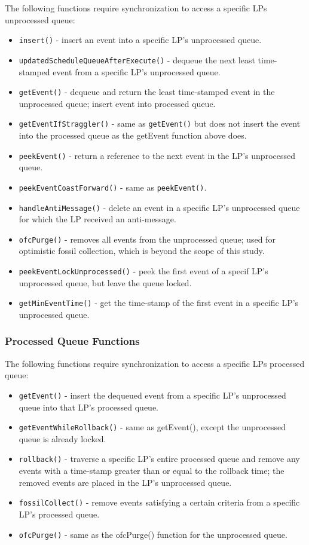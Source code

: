 \documentclass[a4paper]{article}
\let\origitem\item
\renewcommand{\item}{\normalfont\origitem}
\begin{document}
The following functions require synchronization to access a specific LPs
unprocessed queue:\par
\begin{itemize}
\item\texttt{insert()} - insert an event into a specific LP's unprocessed
queue.
\item\texttt{updatedScheduleQueueAfterExecute()} - dequeue the next least
time-stamped event from a specific LP's unprocessed queue.
\item\texttt{getEvent()} - dequeue and return the least time-stamped event in the
unprocessed queue; insert event into processed queue.
\item\texttt{getEventIfStraggler()} - same as \texttt{getEvent()} but does not insert
the event into the processed queue as the getEvent function above does.\
\item\texttt{peekEvent()} - return a reference to the next event in the LP's
unprocessed queue.
\item\texttt{peekEventCoastForward()} - same as \texttt{peekEvent()}.
\item\texttt{handleAntiMessage()} - delete an event in a specific LP's unprocessed queue
for which the LP received an anti-message.
\item\texttt{ofcPurge()} - removes all events from the unprocessed queue; used for
optimistic fossil collection, which is beyond the scope of this study.
\item\texttt{peekEventLockUnprocessed()} - peek the first event of a specif LP's
unprocessed queue, but leave the queue locked.
\item\texttt{getMinEventTime()} - get the time-stamp of the first event in a specific
LP's unprocessed queue.
\end{itemize}

\subsubsection{\textbf{Processed Queue Functions}}

The following functions require synchronization to access a specific LPs
processed queue:\par
\begin{itemize}
\item\texttt{getEvent()} - insert the dequeued event from a specific LP's unprocessed
queue into that LP's processed queue.
\item\texttt{getEventWhileRollback()} - same as getEvent(), except the unprocessed
queue is already locked.%
\item\texttt{rollback()} - traverse a specific LP's entire processed queue and remove
any events with a time-stamp greater than or equal to the rollback time; the
removed events are placed in the LP's unprocessed queue.
\item\texttt{fossilCollect()} - remove events satisfying a certain criteria from a
specific LP's processed queue.
\item\texttt{ofcPurge()} - same as the ofcPurge() function for the unprocessed
queue.
\end{itemize}
\end{document}
